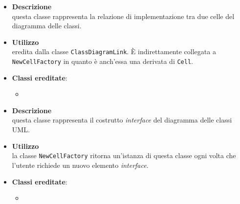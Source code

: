 \label{\nogloxy{swedesigner::client::model::celltypes::class::HxImplementation}}
\begin{itemize}
\item \textbf{Descrizione}\\
questa classe rappresenta la relazione di implementazione tra due celle del diagramma delle classi.
\item \textbf{Utilizzo}\\
eredita dalla classe \texttt{ClassDiagramLink}. È indirettamente collegata a \texttt{NewCellFactory} in quanto è anch'essa una derivata di \texttt{Cell}.
\item \textbf{Classi ereditate}:
\begin{itemize}
\item \hyperref[\nogloxy{swedesigner::client::model::celltypes::class::ClassDiagramLink}]{}
\end{itemize}
\end{itemize}

\label{\nogloxy{swedesigner::client::model::celltypes::class::HxInterface}}
\begin{itemize}
\item \textbf{Descrizione}\\
questa classe rappresenta il costrutto \emph{interface} del diagramma delle classi UML.
\item \textbf{Utilizzo}\\
la classe \texttt{NewCellFactory} ritorna un'istanza di questa classe ogni volta che l'utente richiede un nuovo elemento \emph{interface}.
\item \textbf{Classi ereditate}:
\begin{itemize}
\item \hyperref[\nogloxy{swedesigner::client::model::celltypes::class::ClassDiagramElement}]{}
\end{itemize}
\end{itemize}
\subsection{}
\label{\nogloxy{swedesigner::client::model::utility}}
